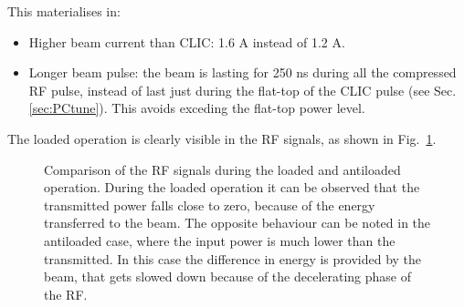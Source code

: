 This materialises in:
\begin{itemize}
\item Higher beam current than CLIC: 1.6 A instead of 1.2 A.
\item Longer beam pulse: the beam is lasting for 250 ns during all the compressed RF pulse, instead of last just during the flat-top of the CLIC pulse (see Sec. \ref{sec:PCtune}). This avoids exceding the flat-top power level.
\end{itemize}
The loaded operation is clearly visible  in the RF signals, as shown in Fig.~\ref{RF_load}.

\begin{figure}[h]
\centering
\caption{Comparison of the RF signals during the loaded and antiloaded operation. During the loaded operation it can be observed that the transmitted power falls close to zero, because of the energy transferred to the beam. The opposite behaviour can be noted in the antiloaded case, where the input power is much lower than the transmitted. In this case the difference in energy is provided by the beam, that gets slowed down because of the decelerating phase of the RF. }
 \label{RF_load}
 \end{figure}


